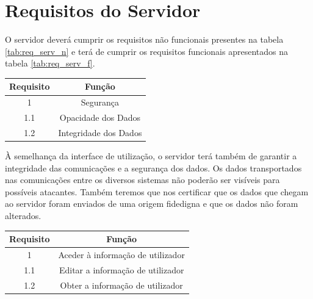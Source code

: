 \section{Requisitos do Servidor} \label{sec:req_servidor}
 
O servidor deverá cumprir os requisitos não funcionais presentes na tabela \ref{tab:req_serv_n} e terá de cumprir os requisitos funcionais apresentados na tabela \ref{tab:req_serv_f}.

\begin{center}
\begin{tabular}[c]{||c c||} 
\hline
Requisito & Função\\ %
\hline
1 & Segurança\\ 

1.1 & Opacidade dos Dados\\

1.2 & Integridade dos Dados\\
\hline
\end{tabular}
\label{tab:req_serv_n}
\end{center}
\vspace{8mm} %

À semelhança da interface de utilização, o servidor terá também de garantir a integridade das comunicações e a segurança dos dados. Os dados transportados nas comunicações entre os diversos sistemas não poderão ser visíveis para possíveis atacantes. Também teremos que nos certificar que os dados que chegam ao servidor foram enviados de uma origem fidedigna e que os dados não foram alterados.\\

\begin{center}
\begin{tabular}[c]{||c c||} 
\hline
Requisito & Função\\ %
\hline
1 & Aceder à informação de utilizador\\ 

1.1 & Editar a informação de utilizador\\

1.2 & Obter a informação de utilizador\\
\hline
\end{tabular}
\label{tab:req_serv_f}
\end{center}
\vspace{8mm} %

